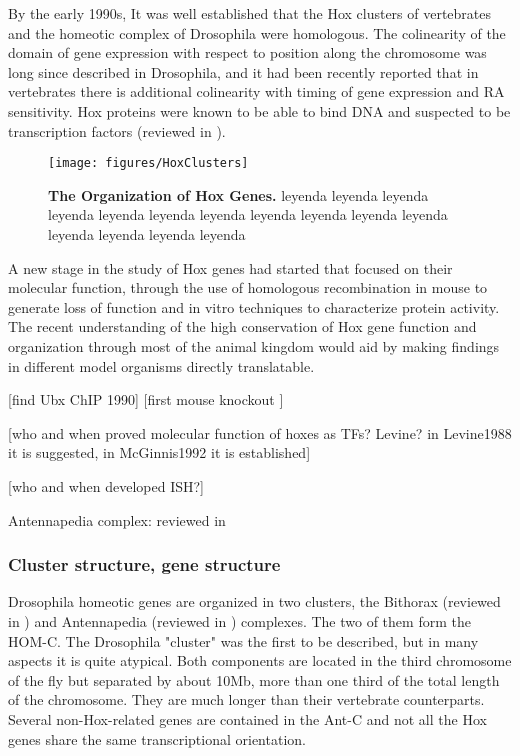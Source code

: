 By the early 1990s, It was well established that the Hox clusters of vertebrates and the homeotic complex of Drosophila were homologous. The colinearity of the domain of gene expression with respect to position along the chromosome was long since described in  Drosophila, and it had been recently reported that in vertebrates there is additional colinearity with timing of gene expression and RA sensitivity. Hox proteins were known to be able to bind DNA and suspected to be transcription factors (reviewed in \cite{Levine1988, McGinnis1992}). 

\begin{figure}[]
  
  \centering
  \label{fig:hoxclusters}
  \texttt{[image: figures/HoxClusters]}
  \caption[The Organization of Hox Genes]{\textbf{The Organization of Hox Genes.} leyenda leyenda leyenda leyenda leyenda leyenda leyenda leyenda leyenda leyenda leyenda leyenda leyenda leyenda leyenda}
\end{figure}

A new stage in the study of Hox genes had started that focused on their molecular function, through the use of homologous recombination in mouse to generate loss of function and in vitro techniques to characterize protein activity. The recent understanding of the high conservation of Hox gene function and organization through most of the animal kingdom would aid by making findings in different model organisms directly translatable. 

[find Ubx ChIP 1990]
[first mouse knockout \cite{Thomas1987}]



[who and when proved molecular function of hoxes as TFs? Levine? in Levine1988 it is suggested, in McGinnis1992 it is established]

[who and when developed ISH?]


Antennapedia complex: reviewed in \cite{Kaufman1990}




\subsubsection{Cluster structure, gene structure}


Drosophila homeotic genes are organized in two clusters, the  Bithorax (reviewed in \cite{Lewis1978}) and Antennapedia (reviewed in \cite{Kaufman1990}) complexes. The two of them form the HOM-C. The Drosophila "cluster" was the first to be described, but in many aspects it is quite atypical. Both components are located in the third chromosome of the fly but separated by about 10Mb, more than one third of the total length of the chromosome. They are much longer than their vertebrate counterparts. Several non-Hox-related genes are contained in the Ant-C and not all the Hox genes share the same transcriptional orientation. 

